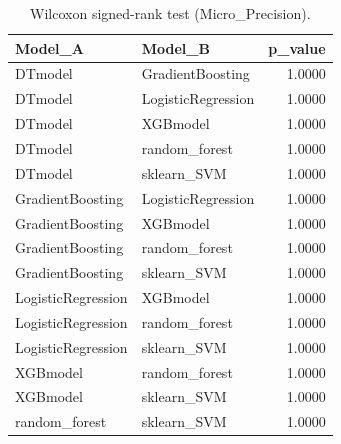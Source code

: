 \begin{table}[t]
\centering
\begin{tabular}{llr}
\toprule
Model_A & Model_B & p_value \\
\midrule
DTmodel & GradientBoosting & 1.0000 \\
DTmodel & LogisticRegression & 1.0000 \\
DTmodel & XGBmodel & 1.0000 \\
DTmodel & random_forest & 1.0000 \\
DTmodel & sklearn_SVM & 1.0000 \\
GradientBoosting & LogisticRegression & 1.0000 \\
GradientBoosting & XGBmodel & 1.0000 \\
GradientBoosting & random_forest & 1.0000 \\
GradientBoosting & sklearn_SVM & 1.0000 \\
LogisticRegression & XGBmodel & 1.0000 \\
LogisticRegression & random_forest & 1.0000 \\
LogisticRegression & sklearn_SVM & 1.0000 \\
XGBmodel & random_forest & 1.0000 \\
XGBmodel & sklearn_SVM & 1.0000 \\
random_forest & sklearn_SVM & 1.0000 \\
\bottomrule
\end{tabular}
\caption{Wilcoxon signed-rank test (Micro_Precision).}
\label{tab:wilcoxon_Micro_Precision}
\end{table}